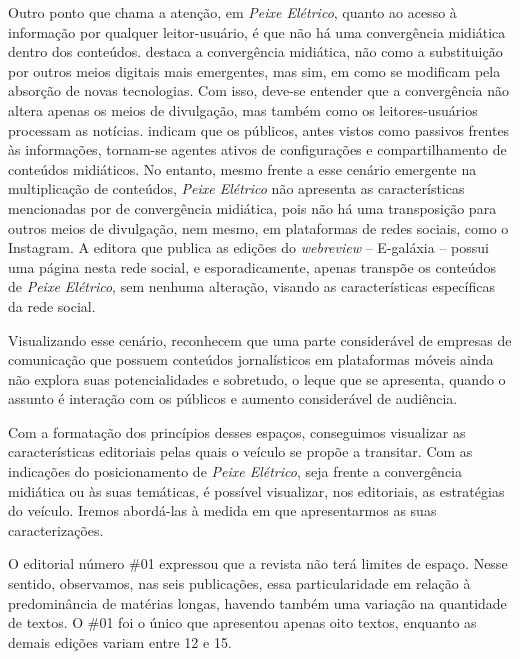 \documentclass[portuguese]{textolivre}
\begin{document}
Outro ponto que chama a atenção, em \textit{Peixe Elétrico}, quanto ao acesso à informação por qualquer leitor-usuário, é que não há uma convergência midiática dentro dos conteúdos. \textcite{jenkins2009} destaca a convergência midiática, não como a substituição por outros meios digitais mais emergentes, mas sim, em como se modificam pela absorção de novas tecnologias. Com isso, deve-se entender que a convergência não altera apenas os meios de divulgação, mas também como os leitores-usuários processam as notícias. \textcite{jenkins2014} indicam que os públicos, antes vistos como passivos frentes às informações, tornam-se agentes ativos de configurações e compartilhamento de conteúdos midiáticos. No entanto, mesmo frente a esse cenário emergente na multiplicação de conteúdos, \textit{Peixe Elétrico} não apresenta as características mencionadas por \textcite{jenkins2009} de convergência midiática, pois não há uma transposição para outros meios de divulgação, nem mesmo, em plataformas de redes sociais, como o Instagram. A editora que publica as edições do \textit{webreview} – E-galáxia – possui uma página nesta rede social, e esporadicamente, apenas transpõe os conteúdos de \textit{Peixe Elétrico}, sem nenhuma alteração, visando as características específicas da rede social.

Visualizando esse cenário, \textcite{canavilhas2011} reconhecem que uma parte considerável de empresas de comunicação que possuem conteúdos jornalísticos em plataformas móveis ainda não explora suas potencialidades e sobretudo, o leque que se apresenta, quando o assunto é interação com os públicos e aumento considerável de audiência.

Com a formatação dos princípios desses espaços, conseguimos visualizar as características editoriais pelas quais o veículo se propõe a transitar. Com as indicações do posicionamento de \textit{Peixe Elétrico}, seja frente a convergência midiática ou às suas temáticas, é possível visualizar, nos editoriais, as estratégias do veículo. Iremos abordá-las à medida em que apresentarmos as suas caracterizações.

O editorial número \#01 expressou que a revista não terá limites de espaço. Nesse sentido, observamos, nas seis publicações, essa particularidade em relação à predominância de matérias longas, havendo também uma variação na quantidade de textos. O \#01 foi o único que apresentou apenas oito textos, enquanto as demais edições variam entre 12 e 15.
\end{document}
